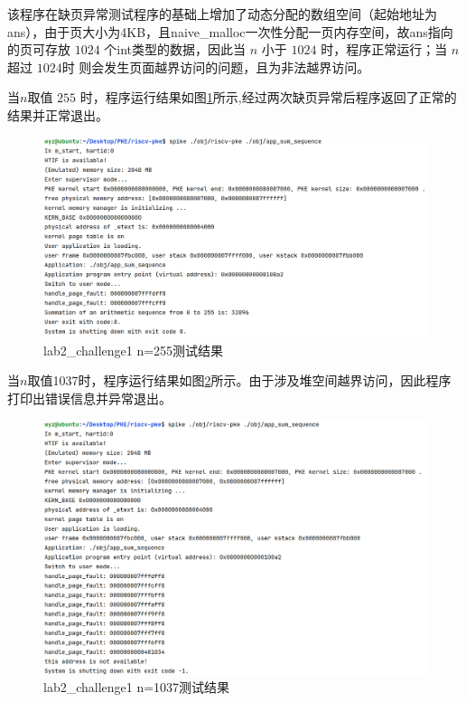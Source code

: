 该程序在缺页异常测试程序的基础上增加了动态分配的数组空间（起始地址为ans），由于页大小为4KB，且naive_malloc一次性分配一页内存空间，故ans指向的页可存放 $1024$ 个int类型的数据，因此当 $n$ 小于 $1024$ 时，程序正常运行；当 $n$ 超过 $1024$时 则会发生页面越界访问的问题，且为非法越界访问。

当$n$取值 $255$ 时，程序运行结果如图\ref{fig:lab2-c1-255}所示,经过两次缺页异常后程序返回了正常的结果并正常退出。
\begin{figure}[!htbp]
    \centering
    \includegraphics[width = 13cm]{figure/lab2_c1_testresult255.png}
    \caption{lab2_challenge1 n=255测试结果}
    \label{fig:lab2-c1-255}
\end{figure}

当$n$取值1037时，程序运行结果如图\ref{fig:lab2-c1-1037}所示。由于涉及堆空间越界访问，因此程序打印出错误信息并异常退出。
\begin{figure}[!htbp]
    \centering
    \includegraphics[width = 13cm]{figure/lab2_c1_testresult1037.png}
    \caption{lab2_challenge1 n=1037测试结果}
    \label{fig:lab2-c1-1037}
\end{figure}

